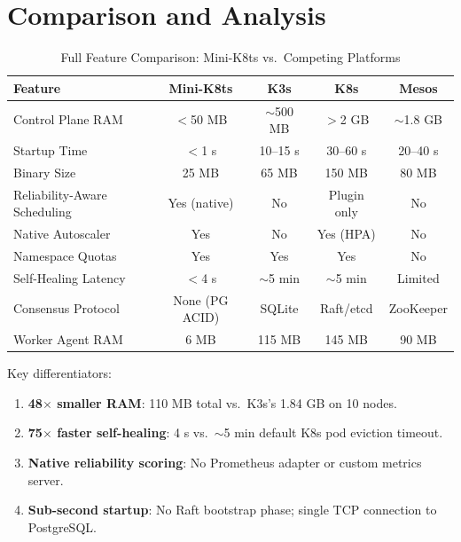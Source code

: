 \documentclass[11pt,a4paper]{article}
\begin{document}
\section{Comparison and Analysis}

\begin{table}[H]
\centering
\caption{Full Feature Comparison: Mini-K8ts vs.\ Competing Platforms}
\label{tab:comparison}
\begin{tabular}{@{} l c c c c @{}}
\toprule
\textbf{Feature}               & \textbf{Mini-K8ts}  & \textbf{K3s}     & \textbf{K8s}       & \textbf{Mesos}   \\
\midrule
Control Plane RAM              & $<$50 MB            & $\sim$500 MB     & $>$2 GB            & $\sim$1.8 GB     \\
Startup Time                   & $<$1 s              & 10--15 s         & 30--60 s           & 20--40 s         \\
Binary Size                    & 25 MB               & 65 MB            & 150 MB             & 80 MB            \\
Reliability-Aware Scheduling   & Yes (native)        & No               & Plugin only        & No               \\
Native Autoscaler              & Yes                 & No               & Yes (HPA)          & No               \\
Namespace Quotas               & Yes                 & Yes              & Yes                & No               \\
Self-Healing Latency           & $<$4 s              & $\sim$5 min      & $\sim$5 min        & Limited          \\
Consensus Protocol             & None (PG ACID)      & SQLite           & Raft/etcd          & ZooKeeper        \\
Worker Agent RAM               & 6 MB                & 115 MB           & 145 MB             & 90 MB            \\
\bottomrule
\end{tabular}
\end{table}

Key differentiators:
\begin{enumerate}[label=\textbf{C\arabic*.}]
  \item \textbf{48$\times$ smaller RAM}: 110 MB total vs.\ K3s's 1.84 GB on 10 nodes.
  \item \textbf{75$\times$ faster self-healing}: 4 s vs.\ $\sim$5 min default K8s pod
        eviction timeout.
  \item \textbf{Native reliability scoring}: No Prometheus adapter or custom metrics server.
  \item \textbf{Sub-second startup}: No Raft bootstrap phase; single TCP connection to
        PostgreSQL.
\end{enumerate}
\end{document}
